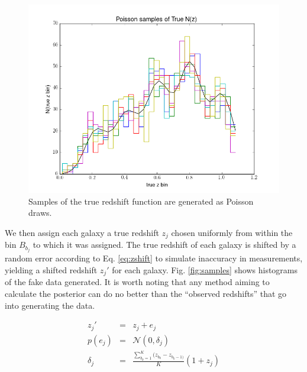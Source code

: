 \documentclass[12pt, onecolumn]{emulateapj}
\begin{document}
\begin{figure}
\label{fig:obsnz}
\includegraphics[scale=0.5]{obsNz.png}
\caption{Samples of the true redshift function are generated as Poisson draws.}
\end{figure}

We then assign each galaxy a true redshift $z_{j}$ chosen uniformly from within the bin $B_{b_{j}}$ to which it was assigned.  The true redshift of each galaxy is shifted by a random error according to Eq. \ref{eq:zshift} to simulate inaccuracy in measurements, yielding a shifted redshift $z_{j}'$ for each galaxy.  Fig. \ref{fig:samples} shows histograms of the fake data generated.  It is worth noting that any method aiming to calculate the posterior can do no better than the ``observed redshifts'' that go into generating the data.

\begin{mathletters}
\begin{eqnarray}
\label{eq:zshift}
z_{j}' &=& z_{j}+e_{j}\\
p(e_{j}) &=& \mathcal{N}(0,\delta_{j})\nonumber\\
\delta_{j} &=& \frac{\sum_{b_{k}=1}^{K}(z_{b_{k}}-z_{b_{k}-1)}}{K}(1+z_{j})\nonumber
\end{eqnarray}
\end{mathletters}
\end{document}
